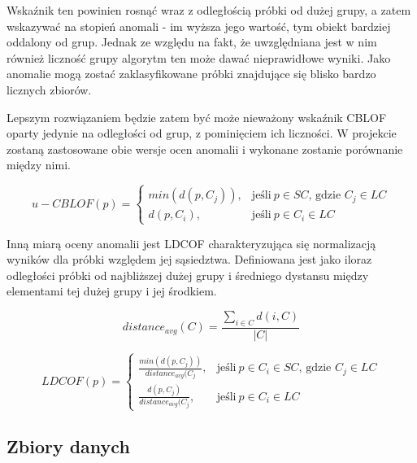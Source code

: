 \documentclass[11pt,a4paper,twoside]{article}
\begin{document}
Wskaźnik ten powinien rosnąć wraz z odległością próbki od dużej grupy, a zatem wskazywać na stopień anomali - im wyższa jego wartość, tym obiekt bardziej oddalony od grup. Jednak ze względu na fakt, że uwzględniana jest w nim również liczność grupy algorytm ten może dawać nieprawidłowe wyniki. Jako anomalie mogą zostać zaklasyfikowane próbki znajdujące się blisko bardzo licznych zbiorów.

Lepszym rozwiązaniem będzie zatem być może nieważony wskaźnik CBLOF oparty jedynie na odległości od grup, z pominięciem ich liczności. W projekcie zostaną zastosowane obie wersje ocen anomalii i wykonane zostanie porównanie między nimi.

\begin{equation}
u-CBLOF(p) = \begin{cases}
   min(d(p,C_{j})), & \text{jeśli}\ p \in SC \text{, gdzie } C_{j} \in LC\\
    d(p,C_{i}), & \text{jeśli}\ p \in C_{i} \in LC
  \end{cases}
\end{equation}

Inną miarą oceny anomalii jest LDCOF charakteryzująca się normalizacją wyników dla próbki względem jej sąsiedztwa. Definiowana jest jako iloraz odległości próbki od najbliższej dużej grupy i średniego dystansu między elementami tej dużej grupy i jej środkiem.

\begin{equation}
distance_{avg}(C) = \frac{\sum_{i \in C} d(i,C)}{|C|}
\end{equation}

\begin{equation}
LDCOF(p) = \begin{cases}
   \frac{min(d(p,C_{j}))}{distance_{avg}(C_{j}}, & \text{jeśli}\ p \in C_{i} \in SC \text{, gdzie } C_{j} \in LC\\
    \frac{d(p,C_{j})}{distance_{avg}(C_{j}}, & \text{jeśli}\ p \in C_{i} \in LC
  \end{cases}
\end{equation}


\subsection{Zbiory danych}
\end{document}
